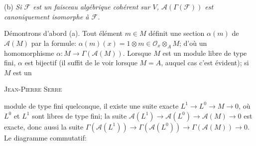 (b) \textit{Si $\mathcal{F}$ est un faisceau algébrique cohérent sur $V$, $\mathcal{A}(\Gamma(\mathcal{F}))$ est canoniquement isomorphe à $\mathcal{F}$.}

Démontrons d'abord (a). Tout élément $m \in M$ définit une section $\alpha(m)$ de $\mathcal{A}(M)$ par la formule: $\alpha(m)(x) = 1 \otimes m \in \mathcal{O}_x \otimes_A M$; d'où un homomorphisme $\alpha : M \to \Gamma(\mathcal{A}(M))$. Lorsque $M$ est un module libre de type fini, $\alpha$ est bijectif (il suffit de le voir lorsque $M = A$, auquel cas c'est évident); si $M$ est un




\textsc{Jean-Pierre Serre}

 module de type fini quelconque, il existe une suite exacte $L^1 \to L^0 \to M \to 0$, où $L^0$ et $L^1$ sont libres de type fini; la suite $\mathcal{A}(L^1) \to \mathcal{A}(L^0) \to \mathcal{A}(M) \to 0$ est exacte, donc aussi la suite $\Gamma(\mathcal{A}(L^1)) \to \Gamma(\mathcal{A}(L^0)) \to \Gamma(\mathcal{A}(M)) \to 0$. Le diagramme commutatif:

